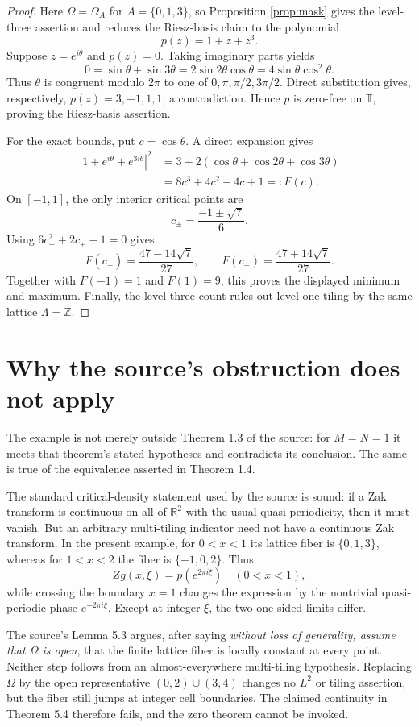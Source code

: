 \documentclass[11pt]{article}
\newcommand{\R}{\mathbb R}
\newcommand{\Z}{\mathbb Z}
\newcommand{\T}{\mathbb T}
\begin{document}
\begin{proof}
Here $\Omega=\Omega_A$ for $A=\{0,1,3\}$, so Proposition
\ref{prop:mask} gives the level-three assertion and reduces the Riesz-basis
claim to the polynomial
\[
 p(z)=1+z+z^3.
\]
Suppose $z=e^{i\theta}$ and $p(z)=0$. Taking imaginary parts yields
\[
 0=\sin\theta+\sin3\theta
  =2\sin2\theta\cos\theta
  =4\sin\theta\cos^2\theta.
\]
Thus $\theta$ is congruent modulo $2\pi$ to one of
$0,\pi,\pi/2,3\pi/2$. Direct substitution gives, respectively,
$p(z)=3,-1,1,1$, a contradiction. Hence $p$ is zero-free on $\T$, proving
the Riesz-basis assertion.

For the exact bounds, put $c=\cos\theta$. A direct expansion gives
\begin{align*}
 |1+e^{i\theta}+e^{3i\theta}|^2
 &=3+2(\cos\theta+\cos2\theta+\cos3\theta)\\
 &=8c^3+4c^2-4c+1=:F(c).
\end{align*}
On $[-1,1]$, the only interior critical points are
\[
 c_\pm=\frac{-1\pm\sqrt7}{6}.
\]
Using $6c_\pm^2+2c_\pm-1=0$ gives
\[
 F(c_+)=\frac{47-14\sqrt7}{27},\qquad
 F(c_-)=\frac{47+14\sqrt7}{27}.
\]
Together with $F(-1)=1$ and $F(1)=9$, this proves the displayed minimum and
maximum. Finally, the level-three count rules out level-one tiling by the
same lattice $\Lambda=\Z$.
\end{proof}

\section{Why the source's obstruction does not apply}

The example is not merely outside Theorem 1.3 of the source: for $M=N=1$ it
meets that theorem's stated hypotheses and contradicts its conclusion.
The same is true of the equivalence asserted in Theorem 1.4.

The standard critical-density statement used by the source is sound: if a
Zak transform is continuous on all of $\R^2$ with the usual
quasi-periodicity, then it must vanish. But an arbitrary multi-tiling
indicator need not have a continuous Zak transform. In the present example,
for $0<x<1$ its lattice fiber is $\{0,1,3\}$, whereas for $1<x<2$ the fiber
is $\{-1,0,2\}$. Thus
\[
 Zg(x,\xi)=p(e^{2\pi i\xi})\quad(0<x<1),
\]
while crossing the boundary $x=1$ changes the expression by the nontrivial
quasi-periodic phase $e^{-2\pi i\xi}$. Except at integer $\xi$, the two
one-sided limits differ.

The source's Lemma 5.3 argues, after saying \emph{without loss of generality,
assume that $\Omega$ is open}, that the finite lattice fiber is locally
constant at every point. Neither step follows from an almost-everywhere
multi-tiling hypothesis. Replacing $\Omega$ by the open representative
$(0,2)\cup(3,4)$ changes no $L^2$ or tiling assertion, but the fiber still
jumps at integer cell boundaries. The claimed continuity in Theorem 5.4
therefore fails, and the zero theorem cannot be invoked.
\end{document}
